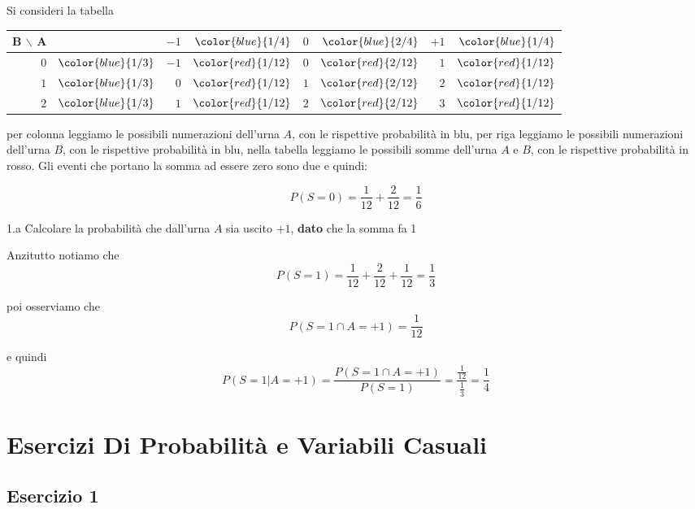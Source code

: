\documentclass[
  11pt,
]{book}
\theoremstyle{mytheoremstyle}
\theoremstyle{mydefstyle}
\newenvironment{sol}
  {
  \begin{tcolorbox}[enhanced,breakable,arc=0.1mm,boxrule=1pt,colback=white,colframe=iblue,
  title=\bf \fontfamily{lmss}\selectfont \hspace{.5 cm} Soluzione,drop fuzzy shadow]

}{
\end{tcolorbox}
  }
\begin{document}
\begin{sol}
Si consideri la tabella

\begin{tabular}{r>{}r|rrrrrr}
\toprule
B $\backslash$ A &  & $-1$ & $\color{blue}{1/4}$ & $0$ & $\color{blue}{2/4}$ & $+1$ & $\color{blue}{1/4}$\\
\midrule
$0$ & $\color{blue}{1/3}$ & $-1$ & $\color{red}{1/{12}}$ & $0$ & $\color{red}{2/{12}}$ & $1$ & $\color{red}{1/{12}}$\\
$1$ & $\color{blue}{1/3}$ & $0$ & $\color{red}{1/{12}}$ & $1$ & $\color{red}{2/{12}}$ & $2$ & $\color{red}{1/{12}}$\\
$2$ & $\color{blue}{1/3}$ & $1$ & $\color{red}{1/{12}}$ & $2$ & $\color{red}{2/{12}}$ & $3$ & $\color{red}{1/{12}}$\\
\bottomrule
\end{tabular}

per colonna leggiamo le possibili numerazioni dell'urna \(A\), con le rispettive probabilità in blu,
per riga leggiamo le possibili numerazioni dell'urna \(B\), con le rispettive probabilità in blu,
nella tabella leggiamo le possibili somme dell'urna \(A\) e \(B\), con le rispettive probabilità in rosso.
Gli eventi che portano la somma ad essere zero sono due e quindi:

\[
P(S=0)=\frac 1{12}+\frac 2{12}=\frac 16
\]

\end{sol}

1.a Calcolare la probabilità che dall'urna \(A\) sia uscito \(\mbox{+1}\), \textbf{dato} che
la somma fa 1

\begin{sol}
Anzitutto notiamo che
\[
P(S=1)=\frac1{12}+\frac2{12}+\frac1{12}=\frac13
\]

poi osserviamo che
\[
P(S=1\cap A=\mbox{+1})=\frac1{12}
\]

e quindi
\[
P(S=1|A=\mbox{+1})=\frac{P(S=1\cap A=\mbox{+1})}{P(S=1)}=\frac{\frac{1}{12}}{\frac13}=\frac14
\]

\end{sol}

\chapter{Esercizi Di Probabilità e Variabili Casuali}\label{esercizi-di-probabilituxe0-e-variabili-casuali}

\section{Esercizio 1}\label{esercizio-1}
\end{document}
